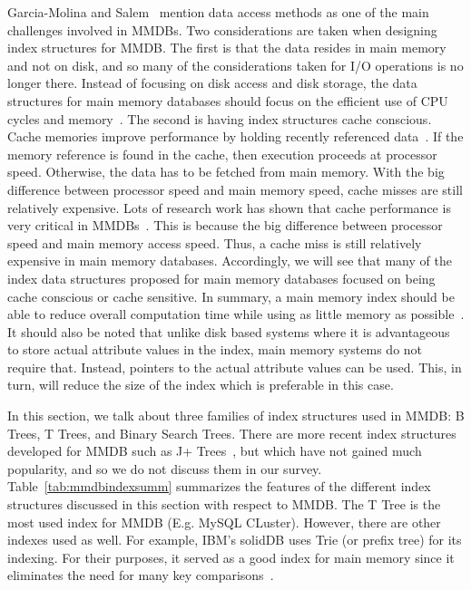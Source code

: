 \documentclass[12pt,a4paper]{article}
\begin{document}
Garcia-Molina and Salem~\cite{garcia1992main} mention data access methods as one of the main challenges involved in MMDBs. Two considerations are taken when
designing index structures for MMDB. The first is that the data resides in main memory and not on disk, and so many of the
considerations taken for I/O operations is no longer there. Instead of focusing on disk access and disk storage, the data structures for main memory
databases should focus on the efficient use of CPU cycles and memory~\cite{lehman1986study}. The second is having index structures cache conscious. Cache
memories improve performance by holding recently referenced data~\cite{smith1982cache}. If the memory reference is found in the cache, then execution proceeds
at processor speed. Otherwise, the data has to be fetched from main memory. With the big difference between processor speed and main memory speed, cache misses
are still relatively expensive. Lots of research work has shown that cache performance is very critical in MMDBs~\cite{boncz1999database,rao1999cache}. This is
because the big difference between processor speed and main memory access speed. Thus, a cache miss is still relatively expensive in main memory databases.
Accordingly, we will see that many of the index data structures proposed for main memory databases focused on being cache conscious or cache sensitive. In
summary, a main memory index should be able to reduce overall computation time while using as little memory as possible~\cite{lehman1986study}. It should also
be noted that unlike disk based systems where it is advantageous to store actual attribute values in the index, main memory systems do not require that.
Instead, pointers to the actual attribute values can be used. This, in turn, will reduce the size of the index which is preferable in this case.

In this section, we talk about three families of index structures used in MMDB: B Trees, T Trees, and Binary Search Trees. There are more recent index
structures developed for MMDB such as J+ Trees~\cite{luan2009prefetching}, but which have not gained much popularity, and so we do not discuss them in our
survey. Table~\ref{tab:mmdbindexsumm} summarizes the features of the different index structures discussed in this section with respect to MMDB. The T Tree is
the most used index for MMDB (E.g. MySQL CLuster). However, there are other indexes used as well. For example, IBM's solidDB uses Trie (or prefix tree) for its
indexing. For their purposes, it served as a good index for main memory since it eliminates the need for many key comparisons~\cite{ibmsoliddb}.
\end{document}
